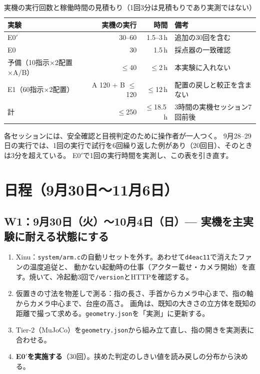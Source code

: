 \documentclass[11pt,a4paper]{article}
\begin{document}
\begin{table}[h]\centering\small
\caption{実機の実行回数と稼働時間の見積もり（1回3分は見積もりであり実測ではない）}
\begin{tabularx}{\textwidth}{@{}lrrY@{}}
\toprule
実験 & 実機の実行 & 時間 & 備考 \\
\midrule
E0$'$ & 30--60 & 1.5--3\,h & 追加の30回を含む \\
E0 & 30 & 1.5\,h & 採点器の一致確認 \\
予備（10指示×2配置×A/B） & $\le$40 & $\le$2\,h & 本実験に入れない \\
E1（60指示×2配置） & A 120 + B $\le$120 & $\le$12\,h & 配置の戻しと較正を含まない \\
\midrule
計 & $\le$250 & $\le$18.5\,h & 3時間の実機セッション7回前後 \\
\bottomrule
\end{tabularx}
\end{table}

\noindent
各セッションには、安全確認と目視判定のために操作者が一人つく。
9月28--29日の実行では、1回の実行で試行を6回繰り返した例があり（20回目）、そのときは3分を超えている。
E0$'$で1回の実行時間を実測し、この表を引き直す。

\section{日程（9月30日〜11月6日）}

\subsection*{W1：9月30日（火）〜10月4日（日）— 実機を主実験に耐える状態にする}
\begin{enumerate}
\item Xinu：\texttt{system/arm.c}の自動リセットを外す。あわせて\texttt{d4eac11}で消えたファンの温度追従と、
動かない起動時の仕事（アクター載せ・カメラ開始）を直す。焼いて、冷起動3回で\texttt{/version}とHTTPを確認する。
\item 仮置きの寸法を物差しで測る：指の長さ、手首からカメラ中心まで、指の軸からカメラ中心まで、台座の高さ。
画角は、既知の大きさの立方体を既知の距離で撮って求める。\texttt{geometry.json}を「実測」に更新する。
\item Tier-2（MuJoCo）を\texttt{geometry.json}から組み立て直し、指の開きを実測表に合わせる。
\item \textbf{E0$'$を実施する}（30回）。挟めた判定のしきい値を読み戻しの分布から決める。
\end{enumerate}
\end{document}
